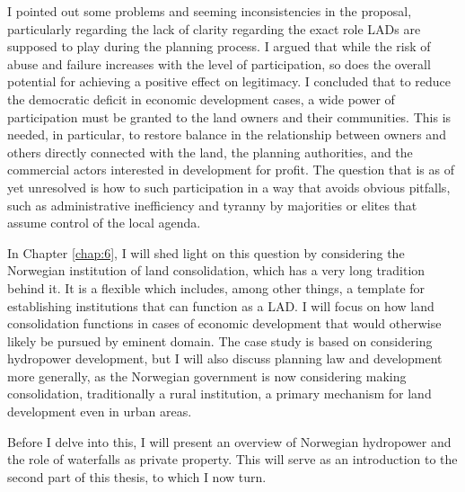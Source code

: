 {I pointed out some problems and seeming inconsistencies in the proposal, particularly regarding the lack of clarity regarding the exact role LADs are supposed to play during the planning process. I argued that while the risk of abuse and failure increases with the level of participation, so does the overall potential for achieving a positive effect on legitimacy. I concluded that to reduce the democratic deficit in economic development cases, a wide power of participation must be granted to the land owners and their communities. This is needed, in particular, to restore balance in the relationship between owners and others directly connected with the land, the planning authorities, and the commercial actors interested in development for profit. The question that is as of yet unresolved is how to  such participation in a way that avoids obvious pitfalls, such as administrative inefficiency and tyranny by majorities or elites that assume control of the local agenda.

In Chapter \ref{chap:6}, I will shed light on this question by considering the Norwegian institution of land consolidation, which has a very long tradition behind it. It is a flexible  which includes, among other things, a template for establishing institutions that can function as a LAD. I will focus on how land consolidation functions in cases of economic development that would otherwise likely be pursued by eminent domain. The case study is based on considering hydropower development, but I will also discuss planning law and development more generally, as the Norwegian government is now considering making consolidation, traditionally a rural institution, a primary mechanism for land development even in urban areas.

Before I delve into this, I will present an overview of Norwegian hydropower and the role of waterfalls  as private property. This will serve as an introduction to the second part of this thesis, to which I now turn. }